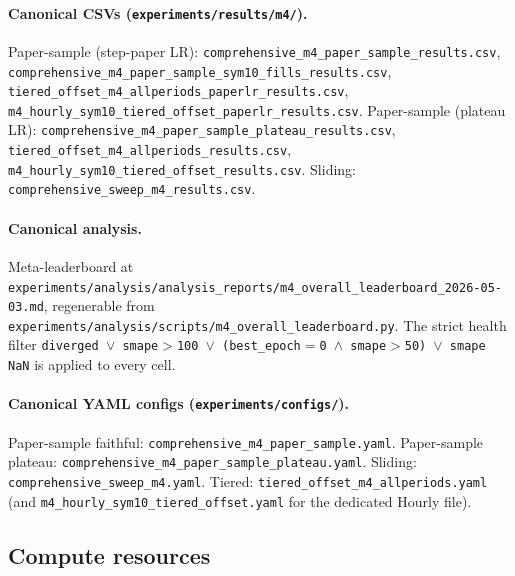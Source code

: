 \documentclass[11pt,a4paper]{article}
\begin{document}
\begin{sloppypar}
\paragraph{Canonical CSVs (\nolinkurl{experiments/results/m4/}).} Paper-sample (step-paper LR): \nolinkurl{comprehensive_m4_paper_sample_results.csv}, \nolinkurl{comprehensive_m4_paper_sample_sym10_fills_results.csv}, \nolinkurl{tiered_offset_m4_allperiods_paperlr_results.csv}, \nolinkurl{m4_hourly_sym10_tiered_offset_paperlr_results.csv}. Paper-sample (plateau LR): \nolinkurl{comprehensive_m4_paper_sample_plateau_results.csv}, \nolinkurl{tiered_offset_m4_allperiods_results.csv}, \nolinkurl{m4_hourly_sym10_tiered_offset_results.csv}. Sliding: \nolinkurl{comprehensive_sweep_m4_results.csv}.

\paragraph{Canonical analysis.} Meta-leaderboard at \nolinkurl{experiments/analysis/analysis_reports/m4_overall_leaderboard_2026-05-03.md}, regenerable from \nolinkurl{experiments/analysis/scripts/m4_overall_leaderboard.py}. The strict health filter \texttt{diverged $\lor$ smape$>$100 $\lor$ (best\_epoch$=$0 $\land$ smape$>$50) $\lor$ smape NaN} is applied to every cell.

\paragraph{Canonical YAML configs (\nolinkurl{experiments/configs/}).} Paper-sample faithful: \nolinkurl{comprehensive_m4_paper_sample.yaml}. Paper-sample plateau: \nolinkurl{comprehensive_m4_paper_sample_plateau.yaml}. Sliding: \nolinkurl{comprehensive_sweep_m4.yaml}. Tiered: \nolinkurl{tiered_offset_m4_allperiods.yaml} (and \nolinkurl{m4_hourly_sym10_tiered_offset.yaml} for the dedicated Hourly file).
\end{sloppypar}

\subsection{Compute resources}
\label{app:hyperparams:compute}
\end{document}
